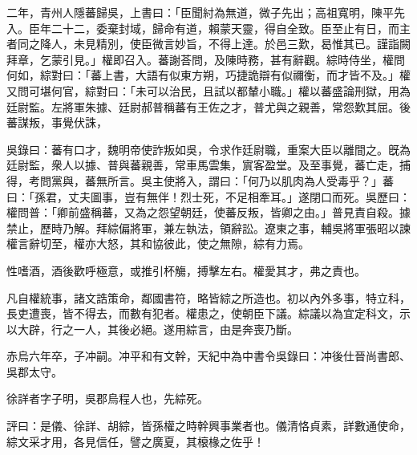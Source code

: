 \begin{pinyinscope}
二年，青州人隱蕃歸吳，上書曰：「臣聞紂為無道，微子先出；高祖寬明，陳平先入。臣年二十二，委棄封域，歸命有道，賴蒙天靈，得自全致。臣至止有日，而主者同之降人，未見精別，使臣微言妙旨，不得上達。於邑三歎，曷惟其已。謹詣闕拜章，乞蒙引見。」權即召入。蕃謝荅問，及陳時務，甚有辭觀。綜時侍坐，權問何如，綜對曰：「蕃上書，大語有似東方朔，巧捷詭辯有似禰衡，而才皆不及。」權又問可堪何官，綜對曰：「未可以治民，且試以都輦小職。」權以蕃盛論刑獄，用為廷尉監。左將軍朱據、廷尉郝普稱蕃有王佐之才，普尤與之親善，常怨歎其屈。後蕃謀叛，事覺伏誅，

吳錄曰：蕃有口才，魏明帝使詐叛如吳，令求作廷尉職，重案大臣以離間之。旣為廷尉監，衆人以據、普與蕃親善，常車馬雲集，賔客盈堂。及至事覺，蕃亡走，捕得，考問黨與，蕃無所言。吳主使將入，謂曰：「何乃以肌肉為人受毒乎？」蕃曰：「孫君，丈夫圖事，豈有無伴！烈士死，不足相牽耳。」遂閉口而死。吳歷曰：權問普：「卿前盛稱蕃，又為之怨望朝廷，使蕃反叛，皆卿之由。」普見責自殺。據禁止，歷時乃解。拜綜偏將軍，兼左執法，領辭訟。遼東之事，輔吳將軍張昭以諫權言辭切至，權亦大怒，其和協彼此，使之無隙，綜有力焉。

性嗜酒，酒後歡呼極意，或推引杯觴，搏擊左右。權愛其才，弗之責也。

凡自權統事，諸文誥策命，鄰國書符，略皆綜之所造也。初以內外多事，特立科，長吏遭喪，皆不得去，而數有犯者。權患之，使朝臣下議。綜議以為宜定科文，示以大辟，行之一人，其後必絕。遂用綜言，由是奔喪乃斷。

赤烏六年卒，子冲嗣。冲平和有文幹，天紀中為中書令吳錄曰：冲後仕晉尚書郎、吳郡太守。

徐詳者字子明，吳郡烏程人也，先綜死。

評曰：是儀、徐詳、胡綜，皆孫權之時幹興事業者也。儀清恪貞素，詳數通使命，綜文采才用，各見信任，譬之廣夏，其榱椽之佐乎！


\end{pinyinscope}